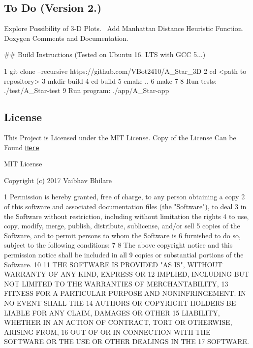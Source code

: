 \subsection*{To Do (Version 2.)}

Explore Possibility of 3-\/D Plots.~\newline
 Add Manhattan Distance Heuristic Function.~\newline
 Doxygen Comments and Documentation.~\newline


\#\# Build Instructions (Tested on Ubuntu 16. L\+TS with G\+CC 5...) 
\begin{DoxyCode}
1 git clone --recursive https://github.com/VBot2410/A\_Star\_3D
2 cd <path to repository>
3 mkdir build
4 cd build
5 cmake ..
6 make
7 
8 Run tests: ./test/A\_Star-test
9 Run program: ./app/A\_Star-app
\end{DoxyCode}
 \subsection*{License}

This Project is Licensed under the M\+IT License. Copy of the License Can be Found \href{https://github.com/VBot2410/A_Star_3D/blob/master/LICENSE}{\tt Here}

M\+IT License

Copyright (c) 2017 Vaibhav Bhilare 
\begin{DoxyCode}
1 Permission is hereby granted, free of charge, to any person obtaining a copy
2 of this software and associated documentation files (the "Software"), to deal
3 in the Software without restriction, including without limitation the rights
4 to use, copy, modify, merge, publish, distribute, sublicense, and/or sell
5 copies of the Software, and to permit persons to whom the Software is
6 furnished to do so, subject to the following conditions:
7 
8 The above copyright notice and this permission notice shall be included in all
9 copies or substantial portions of the Software.
10 
11 THE SOFTWARE IS PROVIDED "AS IS", WITHOUT WARRANTY OF ANY KIND, EXPRESS OR
12 IMPLIED, INCLUDING BUT NOT LIMITED TO THE WARRANTIES OF MERCHANTABILITY,
13 FITNESS FOR A PARTICULAR PURPOSE AND NONINFRINGEMENT. IN NO EVENT SHALL THE
14 AUTHORS OR COPYRIGHT HOLDERS BE LIABLE FOR ANY CLAIM, DAMAGES OR OTHER
15 LIABILITY, WHETHER IN AN ACTION OF CONTRACT, TORT OR OTHERWISE, ARISING FROM,
16 OUT OF OR IN CONNECTION WITH THE SOFTWARE OR THE USE OR OTHER DEALINGS IN THE
17 SOFTWARE.
\end{DoxyCode}
 
